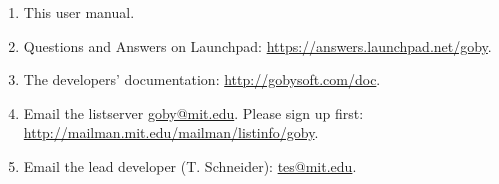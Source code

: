 \begin{enumerate}
\item This user manual. %
\item Questions and Answers on Launchpad: \url{https://answers.launchpad.net/goby}.
\item The developers' documentation: \url{http://gobysoft.com/doc}.
\item Email the listserver \href{mailto:goby@mit.edu}{goby@mit.edu}. Please sign up first: \url{http://mailman.mit.edu/mailman/listinfo/goby}.
\item Email the lead developer (T. Schneider): \href{mailto:tes@mit.edu}{tes@mit.edu}.
\end{enumerate}


